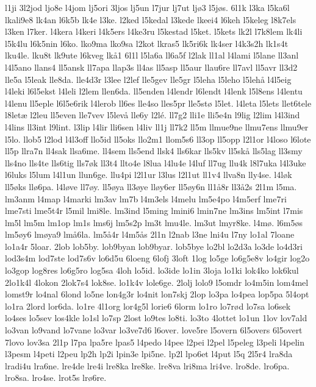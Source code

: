 {l1ji
3l2jod
ljo8e
l4jom
lj5ori
3ljos
lj5un
l7jur
lj7ut
ljø3
l5jøs.
6l1k
l3ka
l5ka6l
lkali9e8
lk4an
l6k5b
lk4e
l3ke.
l2ked
l5kedal
l3kede
lkeei4
l6keh
l5keleg
l8k7els
l3ken
l7ker.
l4kera
l4keri
l4k5ers
l4ke3ru
l5kestad
l5ket.
l5kets
lk2l
l7k8lem
lk4li
l5k4lu
l6k5nin
l6ko.
lko9ma
lko9sa
l2kot
lkras5
lk5ri6k
lk4ser
l4k3s2h
lk1s4t
lku4le.
lku8t
lk9ute
l6kveg
lkå1
6l1l
l5la6a
ll6a5f
l2lak
ll1al
l4lami
l5lane
ll3anl
l4l5ano
llans4
ll5ansk
ll7apa
llap3s
ll4as
ll5asp
ll5aur
llau6re
ll7avl
ll5avr
ll3d2
lle5a
l5leak
lle8da.
lle4d3r
l3lee
l2lef
lle5gev
lle5gr
l5leha
l5leho
l5lehå
l4l5eig
l4leki
l6l5ekst
l4leli
l2lem
llen6da.
ll5enden
l4lendr
l6lendt
l4lenk
l5l8ens
l4lentu
l4lenu
ll5eple
l6l5e6rik
l4lerob
ll6es
lle4so
lles5pr
lle5stø
l5let.
l4leta
l5lets
llet6tele
l8letæ
l2leu
ll5even
lle7vev
l5levå
lle6y
l2lé.
ll7g2
lli1e
lli5e4n
l9lig
l2lim
l4l3ind
l4lins
ll3int
l9lint.
l3lip
l4lir
lli6sen
l4liv
ll1j
ll7k2
ll5m
llmue9ne
llmu7ens
llmu9er
l5lo.
llob5
l2lod
l4l3off
llo5id
ll5oks
llo2m1
llom5s6
ll3op
ll5opp
l2l1or
l4loso
l6lote
ll5p
llra7n
ll4sak
llsa6me.
ll4sem
lls5end
llsk4
lls6kar
lls5kv
ll5skå
lls5lag
ll3smy
lls4no
lls4te
lls6tig
lls7øk
ll3t4
llto4e
l8lua
l4lu4e
l4luf
ll7ug
llu4k
l8l7uka
l4l3uke
l6luks
l5lum
l4l1un
llun6ge.
llu4pi
l2l1ur
l3lus
l2l1ut
ll1v4
llva8n
lly4se.
l4løk
ll5øks
llø6pa.
l4løve
ll7øy.
ll5øya
ll3øye
lløy6er
ll5øy6n
ll1å8r
ll3å2s
2l1m
l5ma.
lm3anm
l4map
l4marki
lm3av
lm7b
l4m3els
l4melu
lm5e4po
l4m5erf
lme7ri
lme7sti
lme5t4r
l5mil
lmi8le.
lm3ind
l5ming
lmini6
lmin7ne
lm3ins
lm5int
l7mis
lm5l
lm5m
lm1op
lm1s
lms6j
lm5s2p
lm3t
lmu4le.
lm3ut
lmyr8ke.
l4mø.
l6m5øs
lm5øy6
lmøya9
lmå6la.
lm5å4r
l4m5ås
2l1n
l2nab
l3ne
lni4u
l7ny
lo1al
7loane
lo1a4r
5loar.
2lob
lob5by.
lob9byan
lob9byar.
lob5bye
lo2bl
lo2d3a
lo3de
lo4d3ri
lod3s4m
lod7ste
lod7s6v
lo6d5u
6loeng
6lofj
3loft
1log
lo5ge
lo6g5e8v
lo4gir
log2o
lo3gop
log8res
lo6g5ro
log5sa
4loh
lo5id.
lo3ide
lo1in
3loja
lo1ki
lok4ko
lok6kul
2lo1k4l
4lokon
2lok7s4
lok8se.
lo1k4v
lole6ge.
2lolj
lolo9
l5omdr
lo4m5in
lom4mel
lomst9r
lo4nal
6lond
lo5ne
lon4g3r
lo4nit
lon7skj
2lop
lo3pa
lo4pea
lop5pa
5l4opt
lo1ra
2lord
lor6da.
lo1re
4l1org
lor4g5l
lorie6
6lorm
lo1ro
lo7rød
lo7sa
lo6sek
lo4ses
lo5sev
los4kle
lo1sl
lo7sp
2lost
lo9tes
lo8ti.
lo3to
4lottet
lo1un
1lov
lov7ald
lo3van
lo9vand
lo7vane
lo3var
lo3ve7d6
l6over.
love5re
l5overn
6l5overs
6l5overt
7lovo
lov3sa
2l1p
l7pa
lpa5re
lpas5
l4pedo
l4pee
l2pei
l2pel
l5peleg
l3peli
l4pelin
l3pesm
l4peti
l2peu
lp2h
lp2i
lpin3e
lpi5ne.
lp2l
lpo6et
l4put
l5q
2l5r4
lra8da
lradi4u
lra6ne.
lre4de
lre4i
lre8ka
lre8ke.
lre8va
lri8ma
lri4ve.
lro8de.
lro6pa.
lro8sa.
lro4se.
lrot5s
lrø6re.
}
